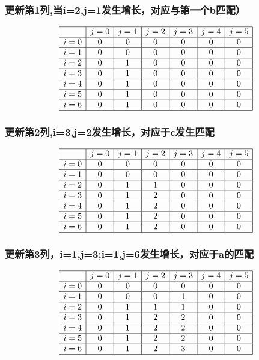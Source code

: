 \documentclass{article}
\begin{document}
\subsubsection*{更新第1列,当i=2,j=1发生增长，对应与第一个b匹配）}
\[
\begin{array}{|c|c|c|c|c|c|c|}
\hline
    & j=0 & j=1 & j=2 & j=3 & j=4 & j=5 \\ \hline
i=0 & 0   & 0   & 0   & 0   & 0   & 0   \\ \hline
i=1 & 0   & 0   & 0   & 0   & 0   & 0   \\ \hline
i=2 & 0   & 1   & 0   & 0   & 0   & 0   \\ \hline
i=3 & 0   & 1   & 0   & 0   & 0   & 0   \\ \hline
i=4 & 0   & 1   & 0   & 0   & 0   & 0   \\ \hline
i=5 & 0   & 1   & 0   & 0   & 0   & 0   \\ \hline
i=6 & 0   & 1   & 0   & 0   & 0   & 0   \\ \hline
\end{array}
\]

\subsubsection*{更新第2列,i=3,j=2发生增长，对应于c发生匹配}
\[
\begin{array}{|c|c|c|c|c|c|c|}
\hline
    & j=0 & j=1 & j=2 & j=3 & j=4 & j=5 \\ \hline
i=0 & 0   & 0   & 0   & 0   & 0   & 0   \\ \hline
i=1 & 0   & 0   & 0   & 0   & 0   & 0   \\ \hline
i=2 & 0   & 1   & 1   & 0   & 0   & 0   \\ \hline
i=3 & 0   & 1   & 2   & 0   & 0   & 0   \\ \hline
i=4 & 0   & 1   & 2   & 0   & 0   & 0   \\ \hline
i=5 & 0   & 1   & 2   & 0   & 0   & 0   \\ \hline
i=6 & 0   & 1   & 2   & 0   & 0   & 0   \\ \hline
\end{array}
\]

\subsubsection*{更新第3列，i=1,j=3;i=1,j=6发生增长，对应于a的匹配}
\[
\begin{array}{|c|c|c|c|c|c|c|}
\hline
    & j=0 & j=1 & j=2 & j=3 & j=4 & j=5 \\ \hline
i=0 & 0   & 0   & 0   & 0   & 0   & 0   \\ \hline
i=1 & 0   & 0   & 0   & 1   & 0   & 0   \\ \hline
i=2 & 0   & 1   & 1   & 1   & 0   & 0   \\ \hline
i=3 & 0   & 1   & 2   & 2   & 0   & 0   \\ \hline
i=4 & 0   & 1   & 2   & 2   & 0   & 0   \\ \hline
i=5 & 0   & 1   & 2   & 2   & 0  & 0   \\ \hline
i=6 & 0   & 1   & 2   & 3   & 0   & 0   \\ \hline
\end{array}
\]
\end{document}
